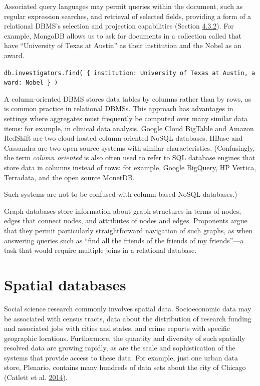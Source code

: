 \documentclass[]{krantz}
\begin{document}
Associated query languages may permit queries within the document, such
as regular expression searches, and retrieval of selected fields,
providing a form of a relational DBMS's selection and projection
capabilities (Section \protect\hyperlink{sec:db:sql}{4.3.2}). For
example, MongoDB allows us to ask for documents in a collection called
that have ``University of Texas at Austin'' as their institution and the
Nobel as an award.

\texttt{db.investigators.find(\ \{\ institution:\ \textquotesingle{}University\ of\ Texas\ at\ Austin\textquotesingle{},\ award:\ \textquotesingle{}Nobel\textquotesingle{}\ \}\ )}

A column-oriented DBMS stores data tables by columns rather than by
rows, as is common practice in relational DBMSs. This approach has
advantages in settings where aggregates must frequently be computed over
many similar data items: for example, in clinical data analysis. Google
Cloud BigTable and Amazon RedShift are two cloud-hosted column-oriented
NoSQL databases. HBase and Cassandra are two open source systems with
similar characteristics. (Confusingly, the term \emph{column oriented}
is also often used to refer to SQL database engines that store data in
columns instead of rows: for example, Google BigQuery, HP Vertica,
Terradata, and the open source MonetDB.

Such systems are not to be confused with column-based NoSQL databases.)

Graph databases store information about graph structures in terms of
nodes, edges that connect nodes, and attributes of nodes and edges.
Proponents argue that they permit particularly straightforward
navigation of such graphs, as when answering queries such as ``find all
the friends of the friends of my friends''---a task that would require
multiple joins in a relational database.

\hypertarget{sec:db:spatial}{\section{Spatial
databases}\label{sec:db:spatial}}

Social science research commonly involves spatial data. Socioeconomic
data may be associated with census tracts, data about the distribution
of research funding and associated jobs with cities and states, and
crime reports with specific geographic locations. Furthermore, the
quantity and diversity of such spatially resolved data are growing
rapidly, as are the scale and sophistication of the systems that provide
access to these data. For example, just one urban data store, Plenario,
contains many hundreds of data sets about the city of Chicago (Catlett
et al. \protect\hyperlink{ref-plenario}{2014}).
\end{document}
